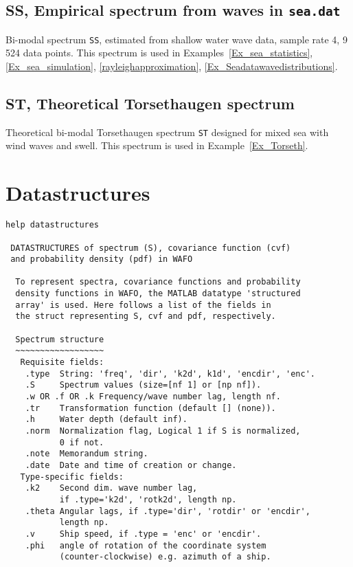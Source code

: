 {\subsection{SS, Empirical spectrum from waves in {\tt sea.dat}}
Bi-modal spectrum {\tt SS}, estimated from shallow water wave data, 
sample rate 4\:[Hz], 9\,524 data points. This spectrum is used in Examples~\ref{Ex_sea_statistics}, 
\ref{Ex_sea_simulation}, \ref{rayleighapproximation}, \ref{Ex_Seadatawavedistributions}.

\subsection{ST, Theoretical {\sc Torsethaugen} spectrum}
Theoretical bi-modal {\sc Torsethaugen} spectrum {\tt ST} designed for mixed sea 
with wind waves and swell. This spectrum is used in Example~\ref{Ex_Torseth}.


\clearpage
\section{Datastructures}\label{sec:datastructures}
\vspace{-3mm}
{\small\begin{verbatim}
help datastructures

 DATASTRUCTURES of spectrum (S), covariance function (cvf)
 and probability density (pdf) in WAFO

  To represent spectra, covariance functions and probability
  density functions in WAFO, the MATLAB datatype 'structured
  array' is used. Here follows a list of the fields in
  the struct representing S, cvf and pdf, respectively.

  Spectrum structure
  ~~~~~~~~~~~~~~~~~~
   Requisite fields:
    .type  String: 'freq', 'dir', 'k2d', k1d', 'encdir', 'enc'.
    .S     Spectrum values (size=[nf 1] or [np nf]).
    .w OR .f OR .k Frequency/wave number lag, length nf.
    .tr    Transformation function (default [] (none)).
    .h     Water depth (default inf).
    .norm  Normalization flag, Logical 1 if S is normalized,
           0 if not.
    .note  Memorandum string.
    .date  Date and time of creation or change.
   Type-specific fields:
    .k2    Second dim. wave number lag,
           if .type='k2d', 'rotk2d', length np.
    .theta Angular lags, if .type='dir', 'rotdir' or 'encdir',
           length np.
    .v     Ship speed, if .type = 'enc' or 'encdir'.
    .phi   angle of rotation of the coordinate system
           (counter-clockwise) e.g. azimuth of a ship.


\end{verbatim}}}
